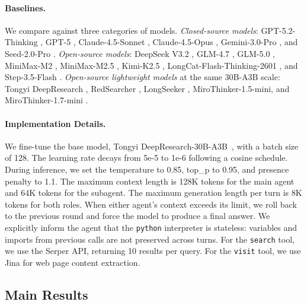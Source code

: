 \documentclass{llmxive}
\begin{document}
\paragraph{Baselines.}
We compare against three categories of models. \textit{Closed-source models}: GPT-5.2-Thinking \citep{openai2025gpt52}, GPT-5 \citep{openai2025gpt5}, Claude-4.5-Sonnet \citep{anthropic2025sonnet45}, Claude-4.5-Opus \citep{anthropic2025opus45}, Gemini-3.0-Pro \citep{google2025gemini3}, and Seed-2.0-Pro \citep{bytedance2026seed2}. \textit{Open-source models}: DeepSeek V3.2 \citep{liu2025deepseek}, GLM-4.7 \citep{glm2025glm47}, GLM-5.0 \citep{zeng2026glm}, MiniMax-M2 \citep{minimax2025m2}, MiniMax-M2.5 \citep{minimax2026m25}, Kimi-K2.5 \citep{team2026kimi}, LongCat-Flash-Thinking-2601 \citep{team2026longcat}, and Step-3.5-Flash \citep{huang2026step}. \textit{Open-source lightweight models} at the same 30B-A3B scale: Tongyi DeepResearch \citep{team2025tongyi}, RedSearcher \citep{chu2026redsearcher}, LongSeeker \citep{lu2026longseeker}, MiroThinker-1.5-mini, and MiroThinker-1.7-mini \citep{team2026mirothinker}.

\paragraph{Implementation Details.}
We fine-tune the base model, Tongyi DeepResearch-30B-A3B~\citep{team2025tongyi}, with a batch size of 128. The learning rate decays from 5e-5 to 1e-6 following a cosine schedule. During inference, we set the temperature to 0.85, top\_p to 0.95, and presence penalty to 1.1. The maximum context length is 128K tokens for the main agent and 64K tokens for the subagent. The maximum generation length per turn is 8K tokens for both roles. When either agent's context exceeds its limit, we roll back to the previous round and force the model to produce a final answer. We explicitly inform the agent that the \texttt{python} interpreter is stateless: variables and imports from previous calls are not preserved across turns. For the \texttt{search} tool, we use the Serper API, returning 10 results per query. For the \texttt{visit} tool, we use Jina for web page content extraction.

\subsection{Main Results}
\end{document}
